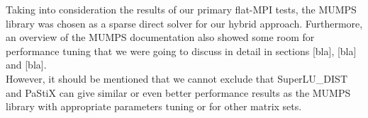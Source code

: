 Taking into consideration the results of our primary flat-MPI tests, the MUMPS library was chosen as a sparse direct solver for our hybrid approach. Furthermore, an overview of the MUMPS documentation also showed some room for performance tuning that we were going to discuss in detail in sections [bla], [bla] and  [bla].\\


However, it should be mentioned that we cannot exclude that SuperLU\_DIST  and PaStiX can give similar or even better performance results as the MUMPS library with appropriate parameters tuning or for other matrix sets.\\
